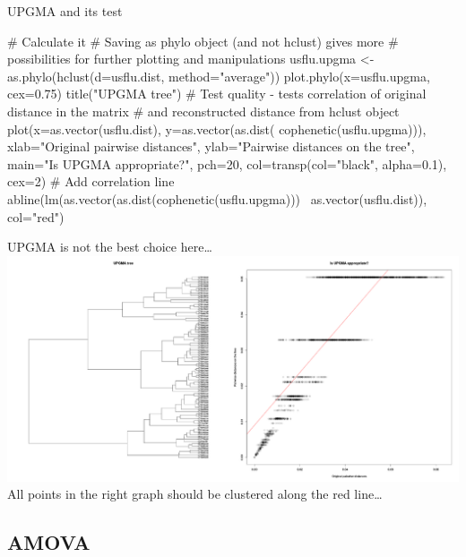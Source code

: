 \documentclass[compress, ucs, xelatex, 11pt, xcolor=svgnames,
  hyperref={
    bookmarks=true,
    unicode=true,
    colorlinks=true,
    pdftitle={Molecular data in R},
    plainpages=false,
    pdfauthor={Vojtech Zeisek},
    pdfsubject={Course about phylogeny and evolution in R},
    pdfcreator={XeLaTeX},
    pdfkeywords={R, evolution, phylogeny, molecular data},
    linkcolor=Tomato,
    anchorcolor=SaddleBrown,
    citecolor=Goldenrod,
    filecolor=DarkMagenta,
    menucolor=Sienna,
    urlcolor=DarkTurquoise,
    pdftex},
  url={hyphens, lowtilde} %
  ]{beamer}
\begin{document}
\begin{frame}[fragile]{UPGMA and its test}
  \begin{spluscode}
    # Calculate it
    # Saving as phylo object (and not hclust) gives more
    # possibilities for further plotting and manipulations
    usflu.upgma <- as.phylo(hclust(d=usflu.dist, method="average"))
    plot.phylo(x=usflu.upgma, cex=0.75)
    title("UPGMA tree")
    # Test quality - tests correlation of original distance in the matrix
    # and reconstructed distance from hclust object
    plot(x=as.vector(usflu.dist), y=as.vector(as.dist(
      cophenetic(usflu.upgma))), xlab="Original pairwise distances",
      ylab="Pairwise distances on the tree", main="Is UPGMA
      appropriate?", pch=20, col=transp(col="black",
      alpha=0.1), cex=2)
    # Add correlation line
    abline(lm(as.vector(as.dist(cophenetic(usflu.upgma)))~
      as.vector(usflu.dist)), col="red")
  \end{spluscode}
\end{frame}

\begin{frame}{UPGMA is not the best choice here\ldots}
  \includegraphics[width=\textwidth]{upgma.png}
  \vfil
  All points in the right graph should be clustered along the red line\ldots
  \vfill
\end{frame}

\subsection{AMOVA} %
\end{document}
